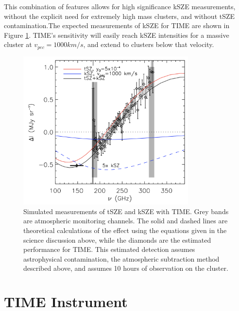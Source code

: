 \documentclass[manuscript]{aastex}
\begin{document}
This combination of features allows for high significance kSZE measurements, without the explicit need for extremely high mass clusters, and without tSZE contamination.The expected measurements of kSZE for TIME are shown in Figure \ref{fig:time1}. TIME's sensitivity will easily reach kSZE intensities for a massive cluster at $v_{pec} = 1000 km/s$, and extend to clusters below that velocity.

\begin{figure}[ht!]
\centering
\captionsetup{width=0.8\textwidth}
\includegraphics[width=0.8\textwidth]{time1.png}
\caption[Expected TIME kSZE \& tSZE Measurements]{Simulated measurements of tSZE and kSZE with TIME. Grey bands are atmospheric monitoring channels. The solid and dashed lines are theoretical calculations of the effect using the equations given in the science discussion above, while the diamonds are the estimated performance for TIME. This estimated detection assumes astrophysical contamination, the atmospheric subtraction method described above, and assumes 10 hours of observation on the cluster.}
\label{fig:time1}
\end{figure}

\section{TIME Instrument}
\end{document}
